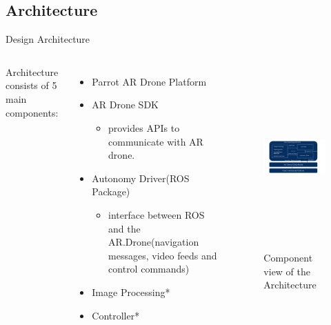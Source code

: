 \documentclass[8pt]{beamer}
\begin{document}
\subsection{Architecture}
\begin{frame}{Design Architecture}

\begin{columns}[c]
        Architecture consists of 5 main components:
  \begin{itemize}
    \setlength\itemsep{1em}
    \item Parrot AR Drone Platform
    \item AR Drone SDK
      \begin{itemize}
	\item provides APIs to communicate with AR drone. 
      \end{itemize}
    \item Autonomy Driver(ROS Package)%
      \begin{itemize}
	\item interface between ROS and the AR.Drone(navigation messages, video feeds and control commands)  
      \end{itemize}
    \item Image Processing*
    \item Controller*
  \end{itemize}
        
        \begin{figure}
             \includegraphics[width=8cm, height=7cm]{images/architecture.png} 
	     \caption{Component view of the Architecture}
        \end{figure}     
	 
\end{columns}

\end{frame}
\end{document}
